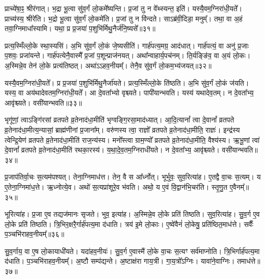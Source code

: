 प्राच्ये॑षा॒ꣴ॒ श्रीर॑गात्।
भ॒द्रा भू॒त्वा सु॑व॒र्गं लो॒कमे᳚ष्यन्ति।
प्र॒जां तु न वे᳚थ्स्यन्त॒ इति॑।
यस्यै॒वम॒ग्निरा॑धी॒यते᳚।
प्राच्य॑स्य॒ श्रीरे॑ति।
भ॒द्रो भू॒त्वा सु॑व॒र्गं लो॒कमे॑ति।
प्र॒जां तु न वि॑न्दते।
साऽब्र॑वी॒दिडा॒ मनुम्᳚।
तथा॒ वा अ॒हं तवा॒ग्निमाधा᳚स्यामि।
यथा॒ प्र प्र॒जया॑ प॒शुभि॑र्मिथु॒नैर्ज॑नि॒ष्यसे᳚॥३१॥\ip

प्रत्य॒स्मिँल्लो॒के स्था॒स्यसि॑।
अ॒भि सु॑व॒र्गं लो॒कं जे॒ष्यसीति॑।
गार्\mbox{}ह॑पत्य॒मग्र॒ आद॑धात्।
गार्\mbox{}ह॑पत्यं॒ वा अनु॑ प्र॒जाः प॒शवः॒ प्रजा॑यन्ते।
गार्\mbox{}ह॑पत्येनै॒वास्मै᳚ प्र॒जां प॒शून्प्राज॑नयत्।
अथा᳚न्वाहार्य॒\-पच॑नम्।
ति॒र्यङ्ङि॑व॒ वा अ॒यं लो॒कः।
अ॒स्मिन्ने॒व तेन॑ लो॒के प्रत्य॑तिष्ठत्।
अथा॑ऽऽहव॒नीयम्᳚।
तेनै॒व सु॑व॒र्गं लो॒कम॒भ्य॑जयत्॥३२॥\ip

यस्यै॒वम॒ग्निरा॑धी॒यते᳚।
प्र प्र॒जया॑ प॒शुभि॑र्मिथु॒नैर्जा॑यते।
प्रत्य॒स्मिँल्लो॒के ति॑ष्ठति।
अ॒भि सु॑व॒र्गं लो॒कं ज॑यति।
यस्य॒ वा अय॑थादेवतम॒ग्निरा॑धी॒यते᳚।
आ दे॒वता᳚भ्यो वृश्च्यते।
पापी॑यान्भवति।
यस्य॑ यथादेव॒तम्।
न दे॒वता᳚भ्य॒ आवृ॑श्च्यते।
वसी॑यान्भवति॥३३॥\ip

भृगू॑णां॒ त्वा\-ऽङ्गि॑रसां व्रतपते व्र॒तेनाद॑धा॒मीति॑ भृग्वङ्गि॒रसा॒\-माद॑ध्यात्।
आ॒दि॒त्यानां᳚ त्वा दे॒वानां᳚ व्रतपते व्र॒तेनाद॑धा॒मी\-त्य॒न्यासां॒ ब्राह्म॑णीनां प्र॒जाना᳚म्।
वरु॑णस्य त्वा॒ राज्ञो᳚ व्रतपते व्र॒तेनाद॑धा॒मीति॒ राज्ञः॑।
इन्द्र॑स्य त्वेन्द्रि॒येण॑ व्रतपते व्र॒तेनाद॑धा॒मीति॑ राज॒न्य॑स्य।
मनो᳚स्त्वा ग्राम॒ण्यो᳚ व्रतपते व्र॒तेनाद॑धा॒मीति॒ वैश्य॑स्य।
ऋ॒भू॒णां त्वा॑ दे॒वानां᳚ व्रतपते व्र॒तेनाद॑धा॒मीति॑ रथका॒रस्य॑।
य॒था॒दे॒व॒तम॒ग्निराधी॑यते।
न दे॒वता᳚भ्य॒ आवृ॑श्च्यते।
वसी॑यान्भवति॥३४॥\ip{}

प्र॒जा\-प॑तिर्वा॒चः स॒त्यम॑पश्यत्।
तेना॒ग्निमाध॑त्त।
तेन॒ वै स आ᳚र्ध्नोत्।
भूर्भुवः॒ सुव॒रित्या॑ह।
ए॒तद्वै वा॒चः स॒त्यम्।
य ए॒तेना॒ग्निमा॑ध॒त्ते।
ऋ॒ध्नोत्ये॒व।
अथो॑ स॒त्यप्रा॑शूरे॒व भ॑वति।
अथो॒ य ए॒वं वि॒द्वान॑भि॒चर॑ति।
स्तृ॒णु॒त ए॒वैनम्᳚॥३५॥\ip

भूरित्या॑ह।
प्र॒जा ए॒व तद्यज॑मानः \-सृजते।
भुव॒ इत्या॑ह।
अ॒स्मिन्ने॒व लो॒के प्रति॑ तिष्ठति।
सुव॒रित्या॑ह।
सु॒व॒र्ग ए॒व लो॒के प्रति॑ तिष्ठति।
त्रि॒भिर॒क्षरै॒र्गार्\mbox{}ह॑पत्य॒मा द॑धाति।
त्रय॑ इ॒मे लो॒काः।
ए॒ष्वे॑वैनं॑ लो॒केषु॒ प्रति॑\-ष्ठित॒माध॑त्ते।
सर्वैः᳚ प॒ञ्चभि॑राहव॒नीयम्᳚॥३६॥\ip

सु॒व॒र्गाय॒ वा ए॒ष लो॒कायाधी॑यते।
यदा॑हव॒नीयः॑।
सु॒व॒र्ग ए॒वास्मै॑ लो॒के वा॒चः स॒त्यꣳ सर्व॑माप्नोति।
त्रि॒भिर्गार्\mbox{}ह॑पत्य॒मा द॑धाति।
प॒ञ्चभि॑राहव॒नीयम्᳚।
अ॒ष्टौ सम्प॑द्यन्ते।
अ॒ष्टाक्ष॑रा गाय॒त्री।
गा॒य॒त्रो᳚\-ऽग्निः।
यावा॑ने॒वाग्निः।
तमाध॑त्ते॥३७॥\ip

